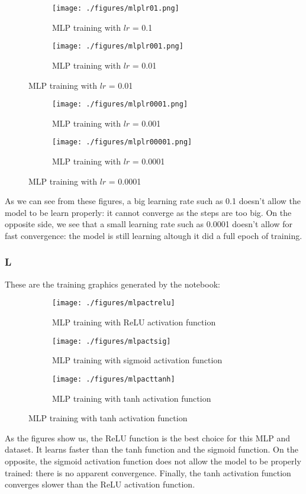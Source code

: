 \documentclass[12pt]{article}
\theoremstyle{definition}
\begin{document}
\begin{figure}[H]
  \centering
  \begin{subfigure}[b]{0.45\textwidth}
    \centering
    \texttt{[image: ./figures/mlplr01.png]}
    \caption{MLP training with $lr$ = 0.1}
  \end{subfigure}
  \hfill
  \begin{subfigure}[b]{0.45\textwidth}
    \centering
    \texttt{[image: ./figures/mlplr001.png]}
    \caption{MLP training with $lr$ = 0.01}
  \end{subfigure}
\end{figure}

\begin{figure}[H]
  \centering
  \begin{subfigure}[b]{0.45\textwidth}
    \centering
    \texttt{[image: ./figures/mlplr0001.png]}
    \caption{MLP training with $lr$ = 0.001}
  \end{subfigure}
  \hfill
  \begin{subfigure}[b]{0.45\textwidth}
    \centering
    \texttt{[image: ./figures/mlplr00001.png]}
    \caption{MLP training with $lr$ = 0.0001}
  \end{subfigure}
\end{figure}
As we can see from these figures, a big learning rate such as 0.1 doesn't allow
the model to be learn properly: it cannot converge as the steps are too
big. On the opposite side, we see that a small learning rate such as 0.0001
doesn't allow for fast convergence: the model is still learning altough it did a
full epoch of training.

\subsubsection*{L} These are the training graphics generated by the notebook:
\begin{figure}[H]
     \centering
     \begin{subfigure}[b]{0.3\textwidth}
         \centering
         \texttt{[image: ./figures/mlpactrelu]}
         \caption{MLP training with ReLU activation function}
     \end{subfigure}
     \hfill
     \begin{subfigure}[b]{0.3\textwidth}
         \centering
         \texttt{[image: ./figures/mlpactsig]}
         \caption{MLP training with sigmoid activation function}
     \end{subfigure}
     \hfill
     \begin{subfigure}[b]{0.3\textwidth}
         \centering
         \texttt{[image: ./figures/mlpacttanh]}
         \caption{MLP training with tanh activation function}
     \end{subfigure}
\end{figure}
As the figures show us, the ReLU function is the best choice for this MLP and
dataset. It learns faster than the tanh function and the sigmoid function. On
the opposite, the sigmoid activation function does not allow the model to be
properly trained: there is no apparent convergence. Finally, the tanh activation
function converges slower than the ReLU activation function.
\end{document}
